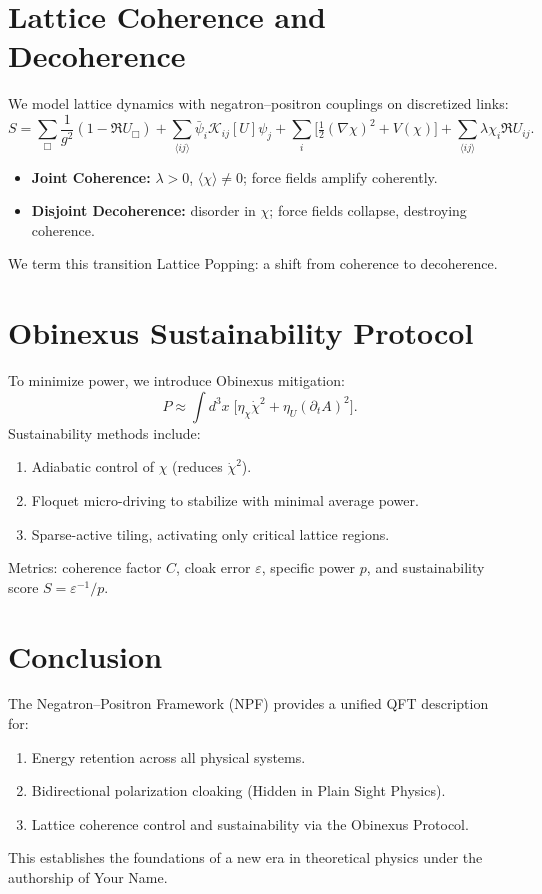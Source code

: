 \documentclass[12pt]{article}
\begin{document}
\section{Lattice Coherence and Decoherence}
We model lattice dynamics with negatron--positron couplings on discretized links:
\begin{equation}
S = \sum_{\Box} \frac{1}{g^2} (1 - \Re U_{\Box}) + \sum_{\langle ij \rangle} \bar{\psi}_i \mathcal{K}_{ij}[U]\psi_j + \sum_i \Big[\tfrac{1}{2}(\nabla \chi)^2 + V(\chi)\Big] + \sum_{\langle ij \rangle}\lambda \chi_i \Re U_{ij}.
\end{equation}
\begin{itemize}
\item \textbf{Joint Coherence:} $\lambda > 0$, $\langle \chi \rangle \neq 0$; force fields amplify coherently.
\item \textbf{Disjoint Decoherence:} disorder in $\chi$; force fields collapse, destroying coherence.
\end{itemize}
We term this transition Lattice Popping: a shift from coherence to decoherence.
\section{Obinexus Sustainability Protocol}
To minimize power, we introduce Obinexus mitigation:
\begin{equation}
P \approx \int d^3x \; \big[\eta_\chi \dot{\chi}^2 + \eta_U (\partial_t A)^2\big].
\end{equation}
Sustainability methods include:
\begin{enumerate}
\item Adiabatic control of $\chi$ (reduces $\dot{\chi}^2$).
\item Floquet micro-driving to stabilize with minimal average power.
\item Sparse-active tiling, activating only critical lattice regions.
\end{enumerate}
Metrics: coherence factor $C$, cloak error $\varepsilon$, specific power $p$, and sustainability score $S=\varepsilon^{-1}/p$.
\section{Conclusion}
The Negatron--Positron Framework (NPF) provides a unified QFT description for:
\begin{enumerate}
\item Energy retention across all physical systems.
\item Bidirectional polarization cloaking (Hidden in Plain Sight Physics).
\item Lattice coherence control and sustainability via the Obinexus Protocol.
\end{enumerate}
This establishes the foundations of a new era in theoretical physics under the authorship of Your Name.
\end{document}
